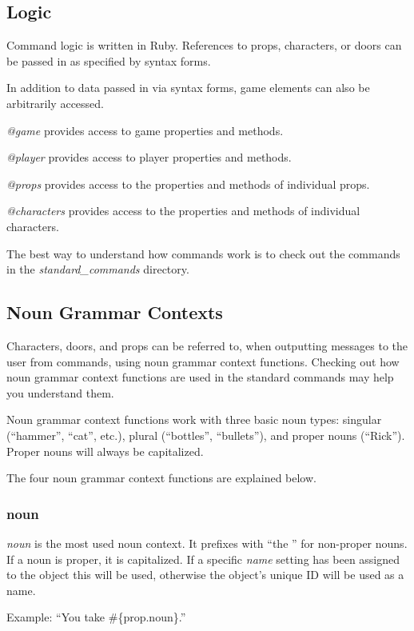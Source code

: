 \documentclass[letterpaper,10pt,english]{sphinxmanual}
\begin{document}
\subsection{Logic}
\label{manipulation:logic}
Command logic is written in Ruby. References to props, characters, or doors can be passed in as specified by syntax forms.

In addition to data passed in via syntax forms, game elements can also be arbitrarily accessed.

\emph{@game} provides access to game properties and methods.

\emph{@player} provides access to player properties and methods.

\emph{@props} provides access to the properties and methods of individual props.

\emph{@characters} provides access to the properties and methods of individual characters.

The best way to understand how commands work is to check out the commands in the \emph{standard\_commands} directory.


\subsection{Noun Grammar Contexts}
\label{manipulation:noun-grammar-contexts}
Characters, doors, and props can be referred to, when outputting messages to the user from commands, using noun grammar context functions. Checking out how noun grammar context functions are used in the standard commands may help you understand them.

Noun grammar context functions work with three basic noun types: singular (``hammer'', ``cat'', etc.), plural (``bottles'', ``bullets''), and proper nouns (``Rick''). Proper nouns will always be capitalized.

The four noun grammar context functions are explained below.


\subsubsection{noun}
\label{manipulation:noun}
\emph{noun} is the most used noun context. It prefixes with ``the '' for non-proper nouns. If a noun is proper, it is capitalized. If a specific \emph{name} setting has been assigned to the object this will be used, otherwise the object's unique ID will be used as a name.

Example: ``You take \#\{prop.noun\}.''
\end{document}
